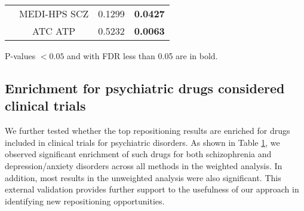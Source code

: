 \begin{table}[htbp]
\begin{threeparttable}
\begin{tabular}{cccc}
                & MEDI-HPS SCZ  & 0.1299 & \textbf{0.0427} \\
                & ATC ATP & 0.5232 & \textbf{0.0063} \\
          \bottomrule
          \end{tabular}%
          \begin{tablenotes}
            \item P-values $< 0.05$ and with FDR less than 0.05 are in bold.
          \end{tablenotes}
        \end{threeparttable}
        \label{tab:repurposing_enrichment}%
      \end{table}%

  \subsection{Enrichment for psychiatric drugs considered clinical trials}
    We further tested whether the top repositioning results are enriched for drugs included in clinical trials for psychiatric disorders. As shown in Table \ref{tab:repurposing_enrichment}, we observed significant enrichment of such drugs for both schizophrenia and depression/anxiety disorders across all methods in the weighted analysis. In addition, most results in the unweighted analysis were also significant. This external validation provides further support to the usefulness of our approach in identifying new repositioning opportunities.
    
